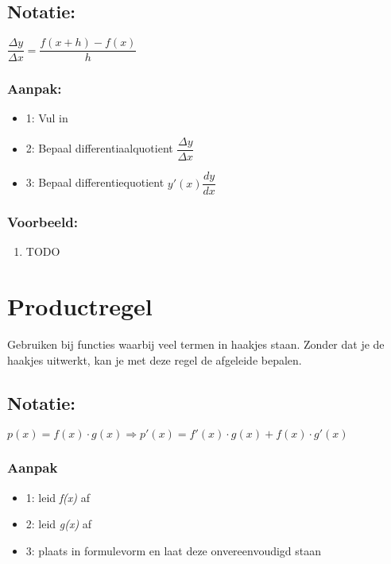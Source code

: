 \documentclass[11pt]{article}
\begin{document}
\subsection{Notatie:}
\label{sec:orgdba9c7a}
\(\dfrac{\Delta y}{\Delta x} = \dfrac{f(x+h) - f(x)}{h}\)
\subsubsection{Aanpak:}
\label{sec:orgfa7aa8b}
\begin{itemize}
\item 1: Vul in
\item 2: Bepaal differentiaalquotient \(\dfrac{\Delta y}{\Delta x}\)
\item 3: Bepaal differentiequotient \(y'(x) \dfrac{dy}{dx}\)
\end{itemize}
\subsubsection{Voorbeeld:}
\label{sec:org516e71c}
\begin{enumerate}
\item TODO
\label{sec:org5d34dc6}
\end{enumerate}


\section{Productregel}
\label{sec:org6b2682d}
Gebruiken bij functies waarbij veel termen in haakjes staan.
Zonder dat je de haakjes uitwerkt, kan je met deze regel de afgeleide bepalen.
\subsection{Notatie:}
\label{sec:orgeafdd2b}
\(p(x) = f(x) \cdot g(x) \Rightarrow p'(x) = f'(x) \cdot g(x) + f(x) \cdot g'(x)\)
\subsubsection{Aanpak}
\label{sec:org3de051c}
\begin{itemize}
\item 1: leid \textit{f(x)} af
\item 2: leid \textit{g(x)} af
\item 3: plaats in formulevorm en laat deze onvereenvoudigd staan
\end{itemize}
\end{document}
